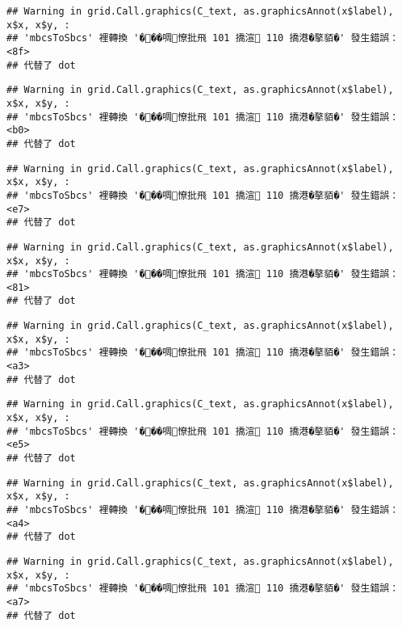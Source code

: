 \documentclass[
]{article}
\begin{document}
\begin{verbatim}
## Warning in grid.Call.graphics(C_text, as.graphicsAnnot(x$label), x$x, x$y, :
## 'mbcsToSbcs' 裡轉換 '���啁憭批飛 101 撟渲 110 撟港�摮貊�' 發生錯誤：<8f>
## 代替了 dot
\end{verbatim}

\begin{verbatim}
## Warning in grid.Call.graphics(C_text, as.graphicsAnnot(x$label), x$x, x$y, :
## 'mbcsToSbcs' 裡轉換 '���啁憭批飛 101 撟渲 110 撟港�摮貊�' 發生錯誤：<b0>
## 代替了 dot
\end{verbatim}

\begin{verbatim}
## Warning in grid.Call.graphics(C_text, as.graphicsAnnot(x$label), x$x, x$y, :
## 'mbcsToSbcs' 裡轉換 '���啁憭批飛 101 撟渲 110 撟港�摮貊�' 發生錯誤：<e7>
## 代替了 dot
\end{verbatim}

\begin{verbatim}
## Warning in grid.Call.graphics(C_text, as.graphicsAnnot(x$label), x$x, x$y, :
## 'mbcsToSbcs' 裡轉換 '���啁憭批飛 101 撟渲 110 撟港�摮貊�' 發生錯誤：<81>
## 代替了 dot
\end{verbatim}

\begin{verbatim}
## Warning in grid.Call.graphics(C_text, as.graphicsAnnot(x$label), x$x, x$y, :
## 'mbcsToSbcs' 裡轉換 '���啁憭批飛 101 撟渲 110 撟港�摮貊�' 發生錯誤：<a3>
## 代替了 dot
\end{verbatim}

\begin{verbatim}
## Warning in grid.Call.graphics(C_text, as.graphicsAnnot(x$label), x$x, x$y, :
## 'mbcsToSbcs' 裡轉換 '���啁憭批飛 101 撟渲 110 撟港�摮貊�' 發生錯誤：<e5>
## 代替了 dot
\end{verbatim}

\begin{verbatim}
## Warning in grid.Call.graphics(C_text, as.graphicsAnnot(x$label), x$x, x$y, :
## 'mbcsToSbcs' 裡轉換 '���啁憭批飛 101 撟渲 110 撟港�摮貊�' 發生錯誤：<a4>
## 代替了 dot
\end{verbatim}

\begin{verbatim}
## Warning in grid.Call.graphics(C_text, as.graphicsAnnot(x$label), x$x, x$y, :
## 'mbcsToSbcs' 裡轉換 '���啁憭批飛 101 撟渲 110 撟港�摮貊�' 發生錯誤：<a7>
## 代替了 dot
\end{verbatim}
\end{document}
